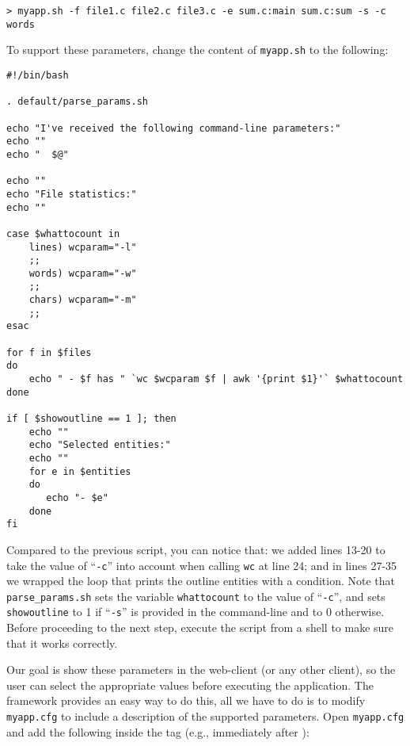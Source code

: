 \medskip
\begin{lstlisting}
> myapp.sh -f file1.c file2.c file3.c -e sum.c:main sum.c:sum -s -c words
\end{lstlisting}

\medskip
\noindent
To support these parameters, change the content of \texttt{myapp.sh}
to the following:

\medskip
\begin{lstlisting}[style=script]
#!/bin/bash

. default/parse_params.sh

echo "I've received the following command-line parameters:"
echo ""
echo "  $@"

echo ""
echo "File statistics:"
echo ""

case $whattocount in
    lines) wcparam="-l"
    ;;
    words) wcparam="-w"
    ;;
    chars) wcparam="-m"
    ;;
esac

for f in $files 
do
    echo " - $f has " `wc $wcparam $f | awk '{print $1}'` $whattocount
done

if [ $showoutline == 1 ]; then
    echo ""
    echo "Selected entities:"
    echo ""
    for e in $entities 
    do
       echo "- $e"
    done
fi
\end{lstlisting}

\medskip
\noindent
Compared to the previous script, you can notice that: we added lines
13-20 to take the value of ``\texttt{-c}'' into account when calling
\texttt{wc} at line 24; and in lines 27-35 we wrapped the loop that
prints the outline entities with a condition.
%
Note that \texttt{parse\_params.sh} sets the variable
\texttt{whattocount} to the value of ``\texttt{-c}'', and sets
\texttt{showoutline} to 1 if ``\texttt{-s}'' is provided in the
command-line and to 0 otherwise. Before proceeding to the next step,
execute the script from a shell to make sure that it works correctly.

Our goal is show these parameters in the web-client (or any other
client), so the user can select the appropriate values before
executing the application. The \ei framework provides an easy way to
do this, all we have to do is to modify \texttt{myapp.cfg} to include
a description of the supported parameters. Open \texttt{myapp.cfg} and
add the following inside the  tag (e.g., immediately after
):


